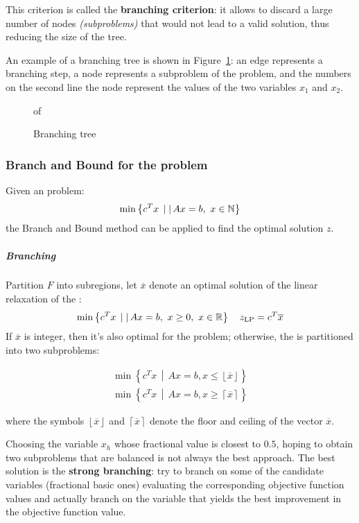 \documentclass[english]{article}
\begin{document}
This criterion is called the \textbf{branching criterion}: it allows to discard a large number of nodes \textit{(subproblems)} that would not lead to a valid solution, thus reducing the size of the tree.

\bigskip
An example of a branching tree is shown in Figure~\ref{fig:branching-tree}: an edge represents a branching step, a node represents a subproblem of the \ILP problem, and the numbers on the second line  the node represent the values of the two variables \(x_1\) and \(x_2\).

\begin{figure}[htbp]of
  \centering
  \bigskip
  \caption{Branching tree}
  \label{fig:branching-tree}
  \bigskip
\end{figure}

\subsubsection{Branch and Bound for the \ILP problem}

Given an \ILP problem:
\[ \min\left\{ c^T x \,\mid\vert\, Ax = b, \ x \in \mathbb{N} \right\} \]
the Branch and Bound method can be applied to find the optimal solution \(z\).

\subparagraph*{Branching}

Partition \(F\) into subregions, let \(\overline{x}\) denote an optimal solution of the linear relaxation of the \ILP:
\[ \min\left\{ c^T x \,\mid\vert\, Ax = b, \ x \geq 0, \ x \in \mathbb{R} \right\} \quad z_{\text{LP}} = c^T \overline{x} \]
If \(\overline{x}\) is integer, then it's also optimal for the \ILP problem;
otherwise, the \ILP is partitioned into two subproblems:

\begin{gather}
  \min\left\{ c^T x \,\middle\vert\, Ax = b, x \leq \left\lfloor \overline{x} \right\rfloor \right\} \label{eq:branch1}\tag{ILP 1} \\
  \min\left\{ c^T x \,\middle\vert\, Ax = b, x \geq \left\lceil \overline{x} \right\rceil \right\} \label{eq:branch2}\tag{ILP 2}
\end{gather}

where the symbols \( \left\lfloor \overline{x} \right\rfloor \) and \( \left\lceil \overline{x} \right\rceil \) denote the floor and ceiling of the vector \(\overline{x}\).

\bigskip
Choosing the variable \(x_h\) whose fractional value is closest to \(0.5\), hoping to obtain two subproblems that are balanced is not always the best approach.
The best solution is the \textbf{strong branching}:
try to branch on some of the candidate variables (fractional basic ones) evaluating the corresponding objective function values and actually branch on the variable that yields the best improvement in the objective function value.
\end{document}
